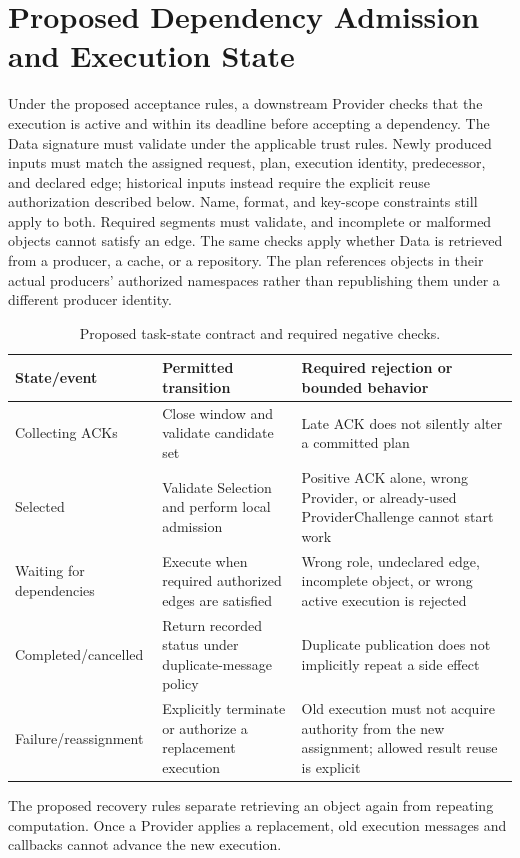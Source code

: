 \section{Proposed Dependency Admission and Execution State}
Under the proposed acceptance rules, a downstream Provider checks that the execution is active and within its deadline before accepting a dependency. The Data signature must validate under the applicable trust rules. Newly produced inputs must match the assigned request, plan, execution identity, predecessor, and declared edge; historical inputs instead require the explicit reuse authorization described below. Name, format, and key-scope constraints still apply to both. Required segments must validate, and incomplete or malformed objects cannot satisfy an edge. The same checks apply whether Data is retrieved from a producer, a cache, or a repository. The plan references objects in their actual producers' authorized namespaces rather than republishing them under a different producer identity.

\begin{table}[htbp]
\centering\small
\caption{Proposed task-state contract and required negative checks.}
\begin{tabularx}{\textwidth}{p{}XX}
\toprule
State/event & Permitted transition & Required rejection or bounded behavior\\\midrule
Collecting ACKs & Close window and validate candidate set & Late ACK does not silently alter a committed plan\\\midrule
Selected & Validate Selection and perform local admission & Positive ACK alone, wrong Provider, or already-used ProviderChallenge cannot start work\\\midrule
Waiting for dependencies & Execute when required authorized edges are satisfied & Wrong role, undeclared edge, incomplete object, or wrong active execution is rejected\\\midrule
Completed/cancelled & Return recorded status under duplicate-message policy & Duplicate publication does not implicitly repeat a side effect\\\midrule
Failure/reassignment & Explicitly terminate or authorize a replacement execution & Old execution must not acquire authority from the new assignment; allowed result reuse is explicit\\\bottomrule
\end{tabularx}
\end{table}

The proposed recovery rules separate retrieving an object again from repeating computation. Once a Provider applies a replacement, old execution messages and callbacks cannot advance the new execution.

